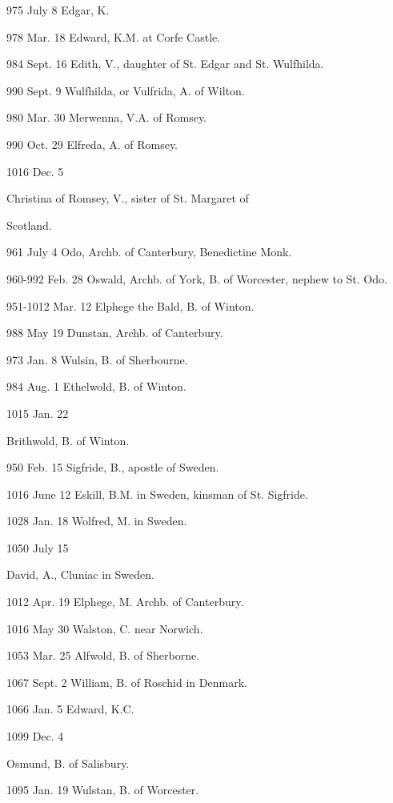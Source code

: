 975 July 8
Edgar, K.

978 Mar. 18
Edward, K.M. at Corfe Castle.

984 Sept. 16
Edith, V., daughter of St. Edgar and St. Wulfhilda.

990 Sept. 9
Wulfhilda, or Vulfrida, A. of Wilton.

980 Mar. 30
Merwenna, V.A. of Romsey.

990 Oct. 29
Elfreda, A. of Romsey.

1016 Dec. 5

Christina of Romsey, V., sister of St. Margaret of

Scotland.


961 July
4
Odo,
Archb. of Canterbury, Benedictine Monk.

960-992 Feb.
28
Oswald,
Archb. of York, B. of Worcester, nephew to St. Odo.

951-1012 Mar.
12
Elphege
the Bald, B. of Winton.

988 May
19
Dunstan, Archb. of Canterbury.

973 Jan.
8
Wulsin, B. of Sherbourne.

984 Aug.
1
Ethelwold, B. of Winton.

1015 Jan.
22

Brithwold, B. of Winton.


950 Feb.
15
Sigfride,
B., apostle of Sweden.

1016 June
12
Eskill, B.M. in Sweden, kinsman of St. Sigfride.

1028 Jan.
18
Wolfred, M. in Sweden.

1050 July
15

David, A., Cluniac in Sweden.


1012 Apr.
19
Elphege,
M. Archb. of Canterbury.

1016 May
30
Walston, C. near Norwich.

1053 Mar.
25
Alfwold, B. of Sherborne.

1067 Sept.
2
William, B. of Roschid in Denmark.

1066 Jan.
5
Edward, K.C.

1099 Dec.
4

Osmund, B. of Salisbury.


1095 Jan.
19
Wulstan,
B. of Worcester.

